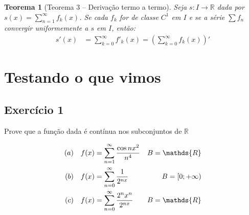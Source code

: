 \documentclass[12pt,openany, letterpaper]{book}
\newtheorem{theorem}{Teorema}[section]
\newcommand{\soma}[2][n]{\sum_{{#1} = #2}^\infty}
\newcommand{\defini}[3][\mathds{R}]{#2: #3 \rightarrow {#1}}
\newcommand{\E}[1]{Exercício #1}
\begin{document}
\begin{theorem}[Teorema 3 -- Derivação termo a termo] \label{T3 C4}
Seja $\defini{s}{I}$ dada por $s(x) = \displaystyle{\soma{1} f_k(x)} $. Se cada $f_k$ for de classe $C^1$ em $I$ e se a série $\sum f_n$ convergir uniformemente a $s$ em $I$, então: \begin{align*}
s'(x) &= \soma[k]{0} f'_k(x) = \left( \soma[k]{0} f_k(x)\right)'
\end{align*}
\end{theorem}

\section{Testando o que vimos}

\subsection*{\E{1}} {Prove que a função dada é contínua nos subconjuntos de $\mathds{R}$} 

\begin{align*}
(a) \ \ \ f(x) &= \soma{1} {\cos nx^2 \over n^4} & B = \mathds{R}\\
(b) \ \ \ f(x) &= \soma{0} {1 \over 2^{nx}} & B = [0; +\infty)\\
(c) \ \ \ f(x) &= \soma{0} {2^n x^n \over 2^{nx}} & B = \mathds{R} \\
\end{align*}
\end{document}
